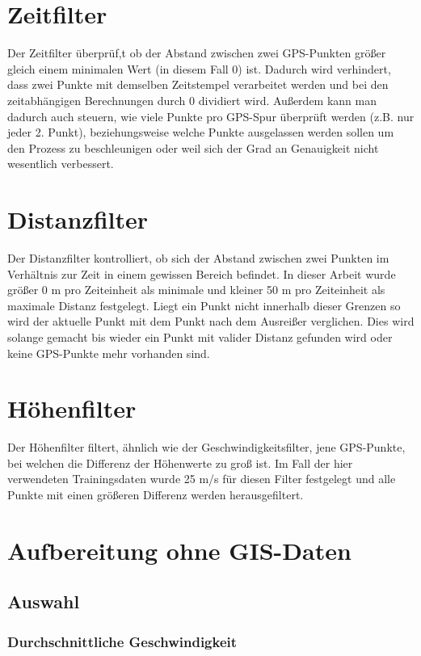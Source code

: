 \section{Zeitfilter}
Der Zeitfilter überprüf,t ob der Abstand zwischen zwei GPS-Punkten größer gleich einem minimalen Wert (in diesem Fall 0) ist. Dadurch wird verhindert, dass zwei Punkte mit demselben Zeitstempel verarbeitet werden und bei den zeitabhängigen Berechnungen durch 0 dividiert wird. Außerdem kann man dadurch auch steuern, wie viele Punkte pro GPS-Spur überprüft werden  (z.B. nur jeder 2. Punkt), beziehungsweise welche Punkte ausgelassen werden sollen um den Prozess zu beschleunigen oder weil sich der Grad an Genauigkeit nicht wesentlich verbessert.

\section{Distanzfilter}
Der Distanzfilter kontrolliert, ob sich der Abstand zwischen zwei Punkten im Verhältnis zur Zeit in einem gewissen Bereich befindet. In dieser Arbeit wurde größer 0 m pro Zeiteinheit als minimale und kleiner 50 m pro Zeiteinheit als maximale Distanz festgelegt. Liegt ein Punkt nicht innerhalb dieser Grenzen so wird der aktuelle Punkt mit dem Punkt nach dem Ausreißer verglichen. Dies wird solange gemacht bis wieder ein Punkt mit valider Distanz gefunden wird oder keine GPS-Punkte mehr vorhanden sind.

\section{Höhenfilter}
Der Höhenfilter filtert, ähnlich wie der Geschwindigkeitsfilter, jene GPS-Punkte, bei welchen die Differenz der Höhenwerte zu groß ist. Im Fall der hier verwendeten Trainingsdaten wurde 25 m/s  für diesen Filter festgelegt und alle Punkte mit einen größeren Differenz werden herausgefiltert.


\clearpage

\section{Aufbereitung ohne GIS-Daten}
\subsection{Auswahl}
\subsubsection{Durchschnittliche Geschwindigkeit}
